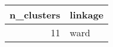 \begin{tabular}{rl}
\toprule
n_clusters & linkage \\
\midrule
11 & ward \\
\bottomrule
\end{tabular}
